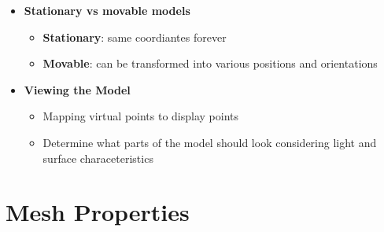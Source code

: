 \begin{itemize}
  \item \textbf{Stationary vs movable models}
  \begin{itemize}
    \item \textbf{Stationary}: same coordiantes forever
    \item \textbf{Movable}: can be transformed into various positions and
    orientations
  \end{itemize}

  \item \textbf{Viewing the Model}
  \begin{itemize}
    \item Mapping virtual points to display points
    \item Determine what parts of the model should look considering light and
    surface characeteristics
  \end{itemize}
\end{itemize}

\section{Mesh Properties}

